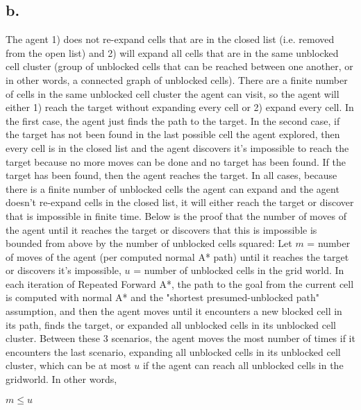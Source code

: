 \documentclass[10pt,a4paper]{article}
\begin{document}
\subsection*{b.}
The agent 1) does not re-expand cells that are in the closed list (i.e. removed from the open list) and 2) will expand all cells that are in the same unblocked cell cluster (group of unblocked cells that can be reached between one another, or in other words, a connected graph of unblocked cells).
\newline\newline
There are a finite number of cells in the same unblocked cell cluster the agent can visit, so the agent will either 1) reach the target without expanding every cell or 2) expand every cell. In the first case, the agent just finds the path to the target. In the second case, if the target has not been found in the last possible cell the agent explored, then every cell is in the closed list and the agent discovers it's impossible to reach the target because no more moves can be done and no target has been found. If the target has been found, then the agent reaches the target. In all cases, because there is a finite number of unblocked cells the agent can expand and the agent doesn't re-expand cells in the closed list, it will either reach the target or discover that is impossible in finite time.
 \newline\newline
Below is the proof that the number of moves of the agent until it reaches the target or discovers that this is impossible is bounded from above by the number of unblocked cells squared:
 \newline\newline
 Let $m$ = number of moves of the agent (per computed normal A* path) until it reaches the target or discovers it's impossible, $u$ = number of unblocked cells in the grid world.
 \newline\newline
In each iteration of Repeated Forward A*, the path to the goal from the current cell is computed with normal A* and the "shortest presumed-unblocked path" assumption, and then the agent moves until it encounters a new blocked cell in its path, finds the target, or expanded all unblocked cells in its unblocked cell cluster. Between these 3 scenarios, the agent moves the most number of times if it encounters the last scenario, expanding all unblocked cells in its unblocked cell cluster, which can be at most $u$ if the agent can reach all unblocked cells in the gridworld. In other words,
\begin{center} $m \leq u$\end{center}
\end{document}
